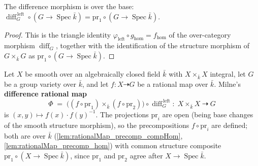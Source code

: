 \begin{lemma}\leanok
  \label{lem:grpObjDiffLeft_comp_hom}
  The difference morphism is over the base: \(\operatorname{diff}_G^{\,\mathrm{left}} \circ
  (G \to \operatorname{Spec}\bar k) = \mathrm{pr}_1 \circ (G \to \operatorname{Spec}\bar k)\).
\end{lemma}
\begin{proof}\leanok
  This is the triangle identity \(\varphi_{\mathrm{left}} \circ g_{\mathrm{hom}} =
  f_{\mathrm{hom}}\) of the over-category morphism \(\operatorname{diff}_G\), together with the
  identification of the structure morphism of \(G \times_{\bar k} G\) as
  \(\mathrm{pr}_1 \circ (G \to \operatorname{Spec}\bar k)\).
\end{proof}

\begin{definition}\leanok
  \label{def:rationalMap_difference}
  Let \(X\) be smooth over an algebraically closed field \(\bar k\) with \(X \times_{\bar k} X\)
  integral, let \(G\) be a group variety over \(\bar k\), and let
  \(f \colon X \dashrightarrow G\) be a rational map over \(\bar k\). Milne's
  \textbf{difference rational map}
  \[
    \Phi \;=\; \bigl((f \circ \mathrm{pr}_1) \times_{\bar k} (f \circ \mathrm{pr}_2)\bigr)
    \circ \operatorname{diff}_G^{\,\mathrm{left}}
    \colon\; X \times_{\bar k} X \;\dashrightarrow\; G
  \]
  is \((x,y) \mapsto f(x) \cdot f(y)^{-1}\). The projections \(\mathrm{pr}_i\) are open (being
  base changes of the smooth structure morphism), so the precompositions
  \(f \circ \mathrm{pr}_i\) are defined; both are over \(\bar k\)
  (\cref{lem:rationalMap_precomp_compHom}, \cref{lem:rationalMap_precomp_hom}) with common
  structure composite \(\mathrm{pr}_1 \circ (X \to \operatorname{Spec}\bar k)\), since
  \(\mathrm{pr}_1\) and \(\mathrm{pr}_2\) agree after \(X \to \operatorname{Spec}\bar k\).
\end{definition}


